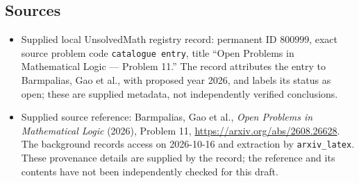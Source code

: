 \documentclass[11pt]{article}
\begin{document}
\subsection{Sources}
\begin{itemize}
\item Supplied local UnsolvedMath registry record: permanent ID \(800999\), exact source problem code \texttt{catalogue entry}, title ``Open Problems in Mathematical Logic --- Problem 11.'' The record attributes the entry to Barmpalias, Gao et al., with proposed year 2026, and labels its status as open; these are supplied metadata, not independently verified conclusions.
\item Supplied source reference: Barmpalias, Gao et al., \emph{Open Problems in Mathematical Logic} (2026), Problem 11, \url{https://arxiv.org/abs/2608.26628}. The background records access on 2026-10-16 and extraction by \texttt{arxiv\_latex}. These provenance details are supplied by the record; the reference and its contents have not been independently checked for this draft.
\end{itemize}
\end{document}
